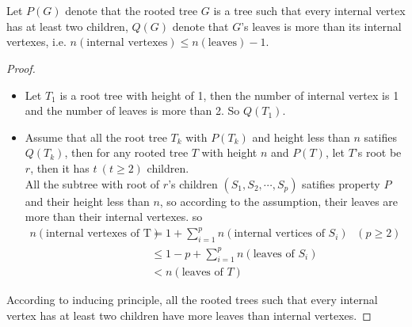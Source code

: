\documentclass{article}
\begin{document}
\section{}

Let $P(G)$ denote that the rooted tree $G$ is a tree such that every internal vertex has at least two children, $Q(G)$ denote that $G$'s leaves is more than its internal vertexes, i.e. $n(\text{internal vertexes}) \leqslant n(\text{leaves}) - 1$. \\

\begin{proof}\quad
    \begin{itemize}
        \item Let $T_1$ is a root tree with height of 1, then the number of internal vertex is 1 and the number of leaves is more than 2. So $Q(T_1)$.
        \item Assume that all the root tree $T_k$ with $P(T_k)$ and height less than $n$ satifies $Q(T_k)$, then for any rooted tree $T$ with height $n$ and $P(T)$, let $T$'s root be $r$, then it has $t\ (t \geqslant 2)$ children.\\
        All the subtree with root of $r$'s children $(S_1, S_2, \cdots, S_p)$ satifies property $P$ and their height less than $n$, so according to the assumption, their leaves are more than their internal vertexes. so
        \begin{align*}
            n(\text{internal vertexes of T}) &= 1 + \sum_{i = 1}^{p}n(\text{internal vertices of }S_i) & \quad (p \geq 2)\\
            &\leqslant 1 - p + \sum_{i = 1}^{p}n(\text{leaves of }S_i) \\
            &< n(\text{leaves of }T)
        \end{align*}
    \end{itemize}
    According to inducing principle, all the rooted trees such that every internal vertex has at least two children have more leaves than internal vertexes.
\end{proof}
\end{document}

